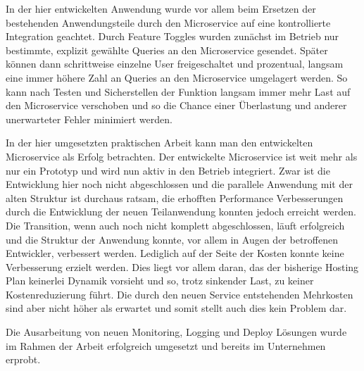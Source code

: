In der hier entwickelten Anwendung wurde vor allem beim Ersetzen der bestehenden Anwendungsteile durch den Microservice auf eine kontrollierte Integration geachtet. Durch Feature Toggles wurden zunächst im Betrieb nur bestimmte, explizit gewählte Queries an den Microservice gesendet. Später können dann schrittweise einzelne User freigeschaltet und prozentual, langsam eine immer höhere Zahl an Queries an den Microservice umgelagert werden. So kann nach Testen und Sicherstellen der Funktion langsam immer mehr Last auf den Microservice verschoben und so die Chance einer Überlastung und anderer unerwarteter Fehler minimiert werden.

In der hier umgesetzten praktischen Arbeit kann man den entwickelten Microservice als Erfolg betrachten. Der entwickelte Microservice ist weit mehr als nur ein Prototyp und wird nun aktiv in den Betrieb integriert. Zwar ist die Entwicklung hier noch nicht abgeschlossen und die parallele Anwendung mit der alten Struktur ist durchaus ratsam, die erhofften Performance Verbesserungen durch die Entwicklung der neuen Teilanwendung konnten jedoch erreicht werden. Die Transition, wenn auch noch nicht komplett abgeschlossen, läuft erfolgreich und die Struktur der Anwendung konnte, vor allem in Augen der betroffenen Entwickler, verbessert werden. Lediglich auf der Seite der Kosten konnte keine Verbesserung erzielt werden. Dies liegt vor allem daran, das der bisherige Hosting Plan keinerlei Dynamik vorsieht und so, trotz sinkender Last, zu keiner Kostenreduzierung führt. Die durch den neuen Service entstehenden Mehrkosten sind aber nicht höher als erwartet und somit stellt auch dies kein Problem dar.

Die Ausarbeitung von neuen Monitoring, Logging und Deploy Lösungen wurde im Rahmen der Arbeit erfolgreich umgesetzt und bereits im Unternehmen erprobt.

